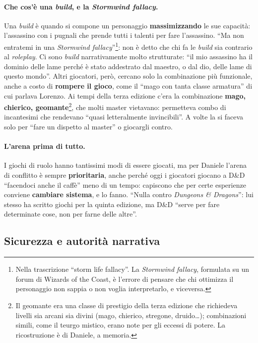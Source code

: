 \paragraph{Che cos'è una \emph{build}, e la \emph{Stormwind fallacy}.} Una \emph{build} è quando si
compone un personaggio \textbf{massimizzando} le sue capacità: l'assassino con i pugnali che prende
tutti i talenti per fare l'assassino. ``Ma non entratemi in una \emph{Stormwind
fallacy}''\footnote{Nella trascrizione ``storm life fallacy''. La \emph{Stormwind fallacy},
formulata su un forum di Wizards of the Coast, è l'errore di pensare che chi ottimizza il
personaggio non sappia o non voglia interpretarlo, e viceversa.}: non è detto che chi fa le
\emph{build} sia contrario al \emph{roleplay}. Ci sono \emph{build} narrativamente molto
strutturate: ``il mio assassino ha il dominio delle lame perché è stato addestrato dal maestro, o
dal dio, delle lame di questo mondo''. Altri giocatori, però, cercano solo la combinazione più
funzionale, anche a costo di \textbf{rompere il gioco}, come il ``mago con tanta classe armatura''
di cui parlava Lorenzo. Ai tempi della terza edizione c'era la combinazione \textbf{mago, chierico,
geomante}\footnote{Il geomante era una classe di prestigio della terza edizione che richiedeva
livelli sia arcani sia divini (mago, chierico, stregone, druido\ldots); combinazioni simili, come
il teurgo mistico, erano note per gli eccessi di potere. La ricostruzione è di Daniele, a
memoria.}, che molti master vietavano: permetteva combo di incantesimi che rendevano ``quasi
letteralmente invincibili''. A volte la si faceva solo per ``fare un dispetto al master'' o
giocargli contro.

\paragraph{L'arena prima di tutto.} I giochi di ruolo hanno tantissimi modi di essere giocati, ma
per Daniele l'arena di conflitto è sempre \textbf{prioritaria}, anche perché oggi i giocatori
giocano a D\&D ``facendoci anche il caffè'' meno di un tempo: capiscono che per certe esperienze
conviene \textbf{cambiare sistema}, e lo fanno. ``Nulla contro \emph{Dungeons \& Dragons}'': lui
stesso ha scritto giochi per la quinta edizione, ma D\&D ``serve per fare determinate cose, non per
farne delle altre''.

\subsection{Sicurezza e autorità narrativa}

